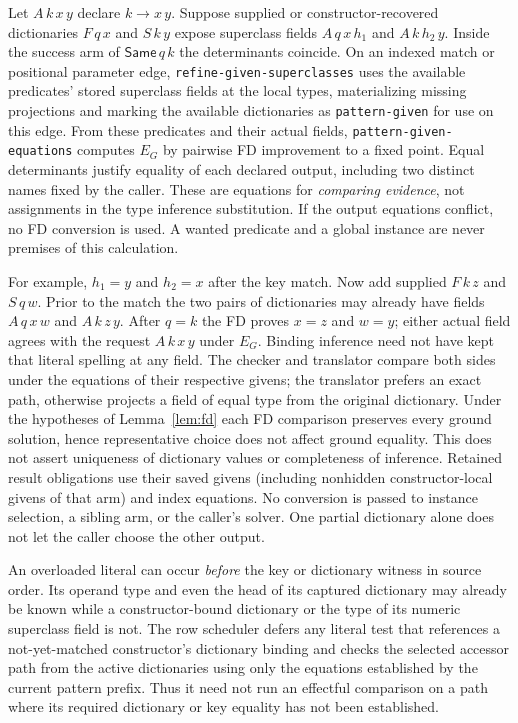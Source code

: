 \documentclass[11pt]{article}
\theoremstyle{definition}
\newcommand{\src}[1]{\nolinkurl{#1}}
\begin{document}
Let $A\,k\,x\,y$ declare $k\to x\,y$. Suppose supplied or
constructor-recovered dictionaries $F\,q\,x$ and $S\,k\,y$ expose
superclass fields $A\,q\,x\,h_1$ and $A\,k\,h_2\,y$. Inside the success arm
of $\mathsf{Same}\,q\,k$ the determinants coincide. On an indexed match or
positional parameter edge, \src{refine-given-superclasses} uses the
available predicates' stored superclass fields at the local types,
materializing missing projections and marking the available dictionaries as
\src{pattern-given} for use on this edge. From these predicates and their
actual fields, \src{pattern-given-equations} computes $E_G$ by pairwise FD
improvement to a fixed point. Equal determinants justify equality of each
declared output, including two distinct names fixed by the caller.
These are equations for \emph{comparing evidence}, not assignments in the
type inference substitution. If the output equations conflict, no FD
conversion is used. A wanted predicate and a global instance are never
premises of this calculation.

For example, $h_1=y$ and $h_2=x$ after the key match. Now add supplied
$F\,k\,z$ and $S\,q\,w$. Prior to the match the two pairs of dictionaries
may already have fields $A\,q\,x\,w$ and $A\,k\,z\,y$. After $q=k$
the FD proves $x=z$ and $w=y$; either actual field agrees with the
request $A\,k\,x\,y$ under $E_G$. Binding inference need not have kept
that literal spelling at any field. The checker and translator compare
both sides under the equations of their respective givens; the translator
prefers an exact path, otherwise projects a field of equal type from the
original dictionary. Under the hypotheses of Lemma~\ref{lem:fd} each
FD comparison preserves every ground solution, hence representative
choice does not affect ground equality. This does not assert uniqueness
of dictionary values or completeness of inference. Retained result
obligations use their saved givens (including nonhidden constructor-local
givens of that arm) and index equations. No conversion is passed to
instance selection, a sibling arm, or the caller's solver. One partial
dictionary alone does not let the caller choose the other output.

An overloaded literal can occur \emph{before} the key or dictionary witness
in source order. Its operand type and even the head of its captured
dictionary may already be known while a constructor-bound dictionary or the
type of its numeric superclass field is not. The row scheduler defers any
literal test that references a not-yet-matched constructor's dictionary
binding and checks the selected accessor path from the active dictionaries
using only the equations established by the current pattern prefix. Thus it
need not run an effectful comparison on a path where its required
dictionary or key equality has not been established.
\end{document}
